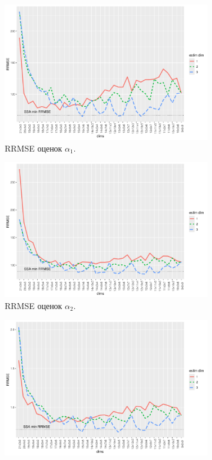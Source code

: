 \documentclass[specialist,
  substylefile=spbu.rtx,
subf,href,colorlinks=true, 12pt]{disser}
\theoremstyle{plain}
\theoremstyle{definition}
\theoremstyle{remark}
\begin{document}
\begin{figure}[!ht]
  \centering
  \begin{subfigure}{0.49\linewidth}
    \includegraphics[width=\linewidth]{rate1_dims_small_eq_rates.pdf}
    \caption{RRMSE оценок $\alpha_1$.}
    \label{fig:rate1_dims_small_eq_rates}
  \end{subfigure}
  \begin{subfigure}{0.49\linewidth}
    \includegraphics[width=\linewidth]{rate2_dims_small_eq_rates.pdf}
    \caption{RRMSE оценок $\alpha_2$.}
    \label{fig:rate2_dims_small_eq_rates}
  \end{subfigure}
  \begin{subfigure}{0.49\linewidth}
    \includegraphics[width=\linewidth]{freq1_dims_small_eq_rates.pdf}

\end{subfigure}
\end{figure}
\end{document}
